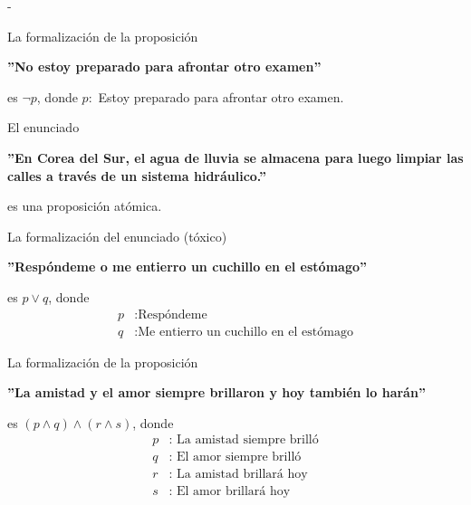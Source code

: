 \documentclass[12pt, a4paper]{exam}
\makeatletter
\renewenvironment{checkboxes}%
   {\setcounter{choice}{0}\list{\checkbox@char}%
      {%
        \settowidth{\leftmargin}{W.\hskip\labelsep\hskip 2.5em}%
        \def\choice{%
          \if@correctchoice
            \color@endgroup \endgroup
          \fi
          \stepcounter{choice}
          \item[\checked@char]
          \do@choice@pageinfo
        } %
        \def\CorrectChoice{%
          \if@correctchoice
            \color@endgroup \endgroup
          \fi
          \ifprintanswers
            \ifhmode \unskip\unskip\unvbox\voidb@x \fi
            \begingroup \color@begingroup \@correctchoicetrue
            \CorrectChoice@Emphasis
            \stepcounter{choice}
            \item[\checked@char]
          \else
            \stepcounter{choice}
            \item[\checked@char]
          \fi
          \do@choice@pageinfo
        } %
        \let\correctchoice\CorrectChoice
        \labelwidth\leftmargin\advance\labelwidth-\labelsep
        \topsep=0pt
        \partopsep=0pt
        \checkboxeshook
      }%
   }%
   {\if@correctchoice \color@endgroup \endgroup \fi \endlist}
\makeatother
\begin{document}
\begin{questions}
        \newpage
        \begin{checkboxes}
            \choice La formalización de la proposición
            \begin{center}
                \textbf{''No estoy preparado para afrontar otro examen''}
            \end{center}

            es $\neg p$, donde $p:$ Estoy preparado para afrontar otro examen.

            \choice El enunciado
            \begin{center}
                \textbf{''En Corea del Sur, el agua de lluvia se almacena para 
                luego limpiar las calles a través de un sistema hidráulico.''}
            \end{center}

            es una proposición atómica. %

            \choice La formalización del enunciado (tóxico)
            \begin{center}
                \textbf{''Respóndeme o me entierro un cuchillo en el 
                estómago''}
            \end{center}

            es $p \lor q$, donde 
            \begin{align*}
                p &: \text{Respóndeme} \\ 
                q &: \text{Me entierro un cuchillo en el estómago}
            \end{align*}

            \choice La formalización de la proposición 
            \begin{center}
                \textbf{''La amistad y el amor siempre brillaron y 
                hoy también lo harán''}
            \end{center}

            es $(p \land q) \land (r \land s)$, donde 
            \begin{align*}
                p &: \text{ La amistad siempre brilló} \\ 
                q &: \text{ El amor siempre brilló} \\ 
                r &: \text{ La amistad brillará hoy} \\ 
                s &: \text{ El amor brillará hoy}
            \end{align*} %
            

\end{checkboxes}
\end{questions}
\end{document}
